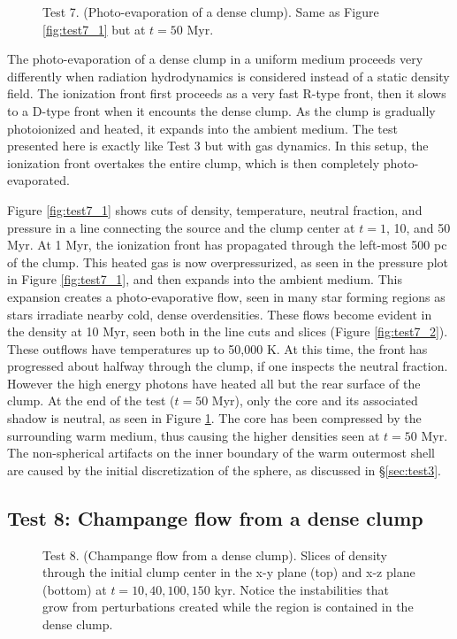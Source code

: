 \documentclass[12pt,preprint]{aastex}
\begin{document}
\begin{figure}[t]
  \caption{\label{fig:test7_3} Test 7. (Photo-evaporation of a dense
    clump).  Same as Figure \ref{fig:test7_1} but at $t = 50$ Myr.}
\end{figure}

The photo-evaporation of a dense clump in a uniform medium proceeds
very differently when radiation hydrodynamics is considered instead of
a static density field.  The ionization front first proceeds as a very
fast R-type front, then it slows to a D-type front when it encounts
the dense clump.  As the clump is gradually photoionized and heated,
it expands into the ambient medium.  The test presented here is
exactly like Test 3 but with gas dynamics.  In this setup, the
ionization front overtakes the entire clump, which is then completely
photo-evaporated.

Figure \ref{fig:test7_1} shows cuts of density, temperature, neutral
fraction, and pressure in a line connecting the source and the clump
center at $t = 1$, 10, and 50 Myr.  At 1 Myr, the ionization front has
propagated through the left-most 500 pc of the clump.  This heated gas
is now overpressurized, as seen in the pressure plot in Figure
\ref{fig:test7_1}, and then expands into the ambient medium.  This
expansion creates a photo-evaporative flow, seen in many star forming
regions \citep[e.g. M16][]{Hester96} as stars irradiate
nearby cold, dense overdensities.  These flows become evident in the
density at 10 Myr, seen both in the line cuts and slices (Figure
\ref{fig:test7_2}).  These outflows have temperatures up to 50,000 K.
At this time, the front has progressed about halfway through the
clump, if one inspects the neutral fraction.  However the high energy
photons have heated all but the rear surface of the clump.  At the end
of the test ($t = 50$ Myr), only the core and its associated shadow is
neutral, as seen in Figure \ref{fig:test7_3}.  The core has been
compressed by the surrounding warm medium, thus causing the higher
densities seen at $t = 50$ Myr.  The non-spherical artifacts on the
inner boundary of the warm outermost shell are caused by the initial
discretization of the sphere, as discussed in \S\ref{sec:test3}.

\subsection{Test 8: Champange flow from a dense clump}

\begin{figure}[t]
  \caption{\label{fig:test8_1} Test 8. (Champange flow from a dense
    clump).  Slices of density through the initial clump center in the
    x-y plane (top) and x-z plane (bottom) at $t = 10, 40, 100, 150$
    kyr.  Notice the instabilities that grow from perturbations
    created while the  region is contained in the dense
    clump.}
\end{figure}
\end{document}
